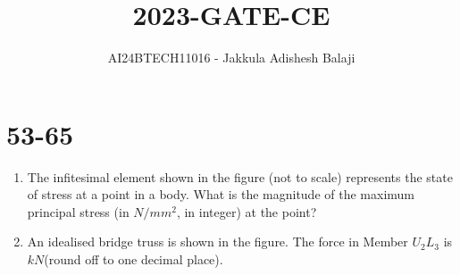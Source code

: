 \documentclass[journal]{IEEEtran}
\begin{document}

\title{2023-GATE-CE}
\author{AI24BTECH11016 - Jakkula Adishesh Balaji}
{\let\newpage\relax\maketitle}

\renewcommand{\thefigure}{\theenumi}
\renewcommand{\thetable}{\theenumi}
\setlength{\intextsep}{10pt} %
\section{53-65}
\begin{enumerate}
	\item
	The infitesimal element shown in the figure (not to scale) represents the state of stress at a point in a body. What is the magnitude of the maximum principal stress (in $N/mm^{2}$, in integer) at the point?
	\begin{figure}[H]
    		\centering
    		
    		\caption{}
    		\label{36}
	\end{figure}
	\item
	An idealised bridge truss is shown in the figure. The force in Member $U_{2}L_{3}$ is $kN$(round off to one decimal place).
		

\end{enumerate}
\end{document}
